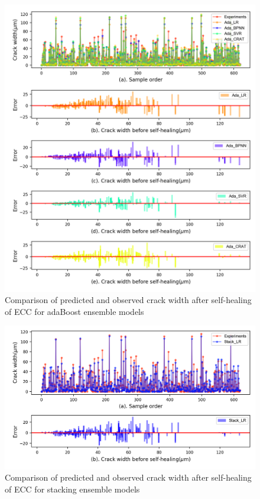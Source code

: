 \documentclass[11pt]{article}
\begin{document}
		\begin{figure}[!h]
		\centering
		\includegraphics[width=\textwidth]{AdaError.png}
		\caption{Comparison of predicted and observed crack width after self-healing of ECC for  adaBoost ensemble models}
		\label{error3}
	\end{figure}

		\begin{figure}[!h]
	\centering
	\includegraphics[width=\textwidth]{StackError.png}
	\caption{Comparison of predicted and observed crack width after self-healing of ECC for  stacking ensemble models}
	\label{error4}
\end{figure}
	
\end{document}
